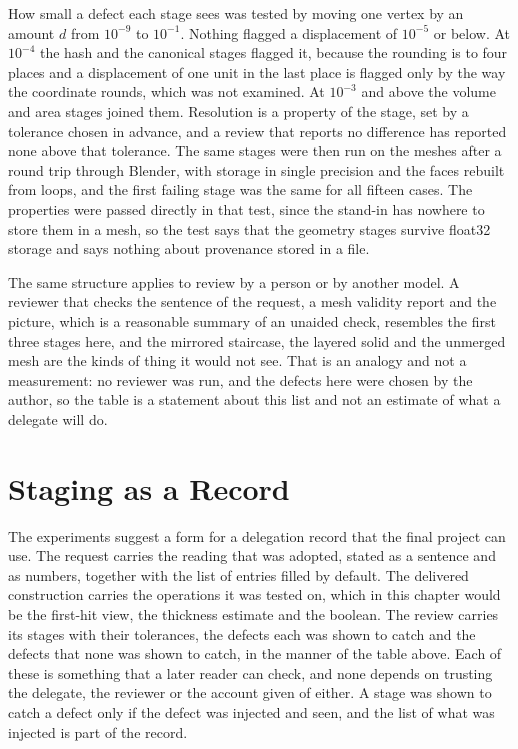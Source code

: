 How small a defect each stage sees was tested by moving one vertex by an amount $d$ from $10^{-9}$ to $10^{-1}$. Nothing flagged a displacement of $10^{-5}$ or below. At $10^{-4}$ the hash and the canonical stages flagged it, because the rounding is to four places and a displacement of one unit in the last place is flagged only by the way the coordinate rounds, which was not examined. At $10^{-3}$ and above the volume and area stages joined them. Resolution is a property of the stage, set by a tolerance chosen in advance, and a review that reports no difference has reported none above that tolerance. The same stages were then run on the meshes after a round trip through Blender, with storage in single precision and the faces rebuilt from loops, and the first failing stage was the same for all fifteen cases. The properties were passed directly in that test, since the stand-in has nowhere to store them in a mesh, so the test says that the geometry stages survive float32 storage and says nothing about provenance stored in a file.

The same structure applies to review by a person or by another model. A reviewer that checks the sentence of the request, a mesh validity report and the picture, which is a reasonable summary of an unaided check, resembles the first three stages here, and the mirrored staircase, the layered solid and the unmerged mesh are the kinds of thing it would not see. That is an analogy and not a measurement: no reviewer was run, and the defects here were chosen by the author, so the table is a statement about this list and not an estimate of what a delegate will do.

\section{Staging as a Record}

The experiments suggest a form for a delegation record that the final project can use. The request carries the reading that was adopted, stated as a sentence and as numbers, together with the list of entries filled by default. The delivered construction carries the operations it was tested on, which in this chapter would be the first-hit view, the thickness estimate and the boolean. The review carries its stages with their tolerances, the defects each was shown to catch and the defects that none was shown to catch, in the manner of the table above. Each of these is something that a later reader can check, and none depends on trusting the delegate, the reviewer or the account given of either. A stage was shown to catch a defect only if the defect was injected and seen, and the list of what was injected is part of the record.

